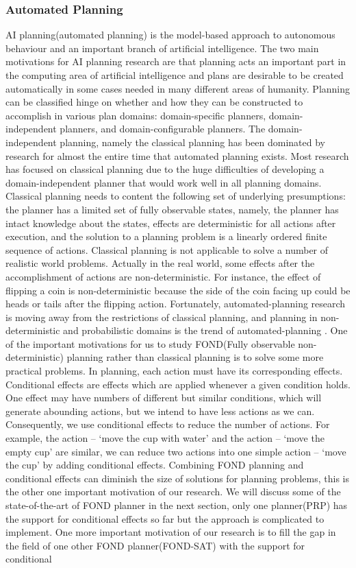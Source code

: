 \documentclass[a4paper,12pt]{article}
\begin{document}
\subsubsection{Automated Planning}
AI planning(automated planning) is the model-based approach to autonomous behaviour and an important branch of artificial intelligence. The two main motivations for AI planning research are that planning acts an important part in the computing area of artificial intelligence and plans are desirable to be created automatically in some cases needed in many different areas of humanity\cite{key1}. Planning can be classified hinge on whether and how they can be constructed to accomplish in various plan domains: domain-specific planners, domain-independent planners, and domain-configurable planners. The domain-independent planning, namely the classical planning has been dominated by research for almost the entire time that automated planning exists\cite{key1}. Most research has focused on classical planning due to the huge difficulties of developing a domain-independent planner that would work well in all planning domains. Classical planning needs to content the following set of underlying presumptions: the planner has a limited set of fully observable states, namely, the planner has intact knowledge about the states, effects are deterministic for all actions after execution, and the solution to a planning problem is a linearly ordered finite sequence of actions\cite{key5}. Classical planning is not applicable to solve a number of realistic world problems. Actually in the real world, some effects after the accomplishment of actions are non-deterministic. For instance, the effect of flipping a coin is non-deterministic because the side of the coin facing up could be heads or tails after the flipping action. Fortunately, automated-planning research is moving away from the restrictions of classical planning, and planning in non-deterministic and probabilistic domains is the trend of automated-planning \cite{key1}. One of the important motivations for us to study FOND(Fully observable non-deterministic) planning rather than classical planning is to solve some more practical problems. In planning, each action must have its corresponding effects. Conditional effects are effects which are applied whenever a given condition holds. One effect may have numbers of different but similar conditions, which will generate abounding actions, but we intend to have less actions as we can. Consequently, we use conditional effects to reduce the number of actions. For example, the action – ‘move the cup with water’ and the action – ‘move the empty cup’ are similar, we can reduce two actions into one simple action – ‘move the cup’ by adding conditional effects. Combining FOND planning and conditional effects can diminish the size of solutions for planning problems, this is the other one important motivation of our research. We will discuss some of the state-of-the-art of FOND planner in the next section, only one planner(PRP) has the support for conditional effects so far but the approach is complicated to implement. One more important motivation of our research is to fill the gap in the field of one other FOND planner(FOND-SAT) with the support for conditional 
\end{document}

